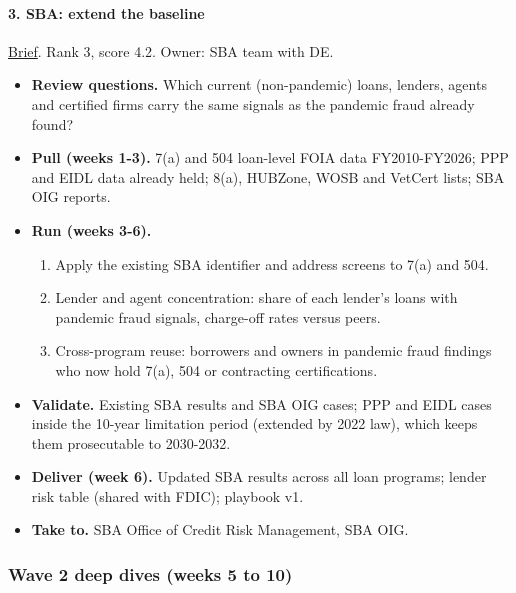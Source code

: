 \documentclass[letterpaper,11pt]{article}
\providecommand{\tightlist}{\setlength{\itemsep}{0pt}\setlength{\parskip}{0pt}}
\begin{document}
\hypertarget{sba-extend-the-baseline}{%
\paragraph{3. SBA: extend the baseline}\label{sba-extend-the-baseline}}

\href{agencies/sba.pdf}{Brief}. Rank 3, score 4.2. Owner: SBA team with
DE.

\begin{itemize}
\tightlist
\item
  \textbf{Review questions.} Which current (non-pandemic) loans,
  lenders, agents and certified firms carry the same signals as the
  pandemic fraud already found?
\item
  \textbf{Pull (weeks 1-3).} 7(a) and 504 loan-level FOIA data
  FY2010-FY2026; PPP and EIDL data already held; 8(a), HUBZone, WOSB and
  VetCert lists; SBA OIG reports.
\item
  \textbf{Run (weeks 3-6).}

  \begin{enumerate}
  \def\labelenumi{\arabic{enumi}.}
  \tightlist
  \item
    Apply the existing SBA identifier and address screens to 7(a) and
    504.
  \item
    Lender and agent concentration: share of each lender's loans with
    pandemic fraud signals, charge-off rates versus peers.
  \item
    Cross-program reuse: borrowers and owners in pandemic fraud findings
    who now hold 7(a), 504 or contracting certifications.
  \end{enumerate}
\item
  \textbf{Validate.} Existing SBA results and SBA OIG cases; PPP and
  EIDL cases inside the 10-year limitation period (extended by 2022
  law), which keeps them prosecutable to 2030-2032.
\item
  \textbf{Deliver (week 6).} Updated SBA results across all loan
  programs; lender risk table (shared with FDIC); playbook v1.
\item
  \textbf{Take to.} SBA Office of Credit Risk Management, SBA OIG.
\end{itemize}

\hypertarget{wave-2-deep-dives-weeks-5-to-10}{%
\subsubsection{Wave 2 deep dives (weeks 5 to
10)}\label{wave-2-deep-dives-weeks-5-to-10}}
\end{document}
